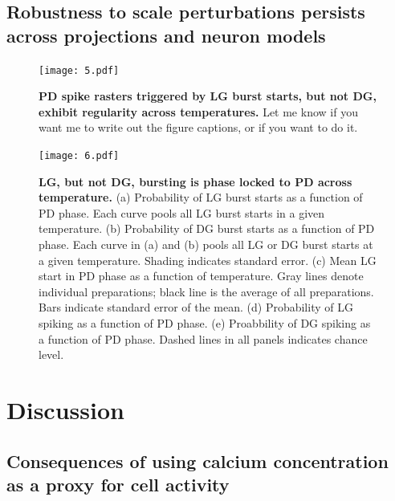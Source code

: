\documentclass[9pt,lineno]{elife}
\begin{document}
\lipsum[3-5]

\subsection{Robustness to scale perturbations persists across projections and neuron models}

\begin{figure}[!hbp]
\centering
\begin{fullwidth}
\texttt{[image: 5.pdf]}
\end{fullwidth}
\caption{\textbf{PD spike rasters triggered by LG burst starts, but not DG, exhibit regularity across temperatures.} Let me know if you want me to write out the figure captions, or if you want to do it.   }
\end{figure}

\lipsum[2-4]

\begin{figure}[!htp]
\centering
\begin{fullwidth}
\texttt{[image: 6.pdf]}
\end{fullwidth}
\caption{\textbf{LG, but not DG, bursting is phase locked to PD across temperature.} (a) Probability of LG burst starts as a function of PD phase. Each curve pools all LG burst starts in a given temperature.  (b) Probability of DG burst starts as a function of PD phase. Each curve in (a) and (b) pools all LG or DG burst starts at a given temperature. Shading indicates standard error.  (c) Mean LG start in PD phase as a function of temperature. Gray lines denote individual preparations; black line is the average of all preparations. Bars indicate standard error of the mean. (d) Probability of LG spiking as a function of PD phase. (e) Proabbility of DG spiking as a function of PD phase.  Dashed lines in all panels indicates chance level.}
\end{figure}


\section{Discussion}




\subsection{Consequences of using calcium concentration as a proxy for cell activity}

\lipsum[5]
\end{document}
